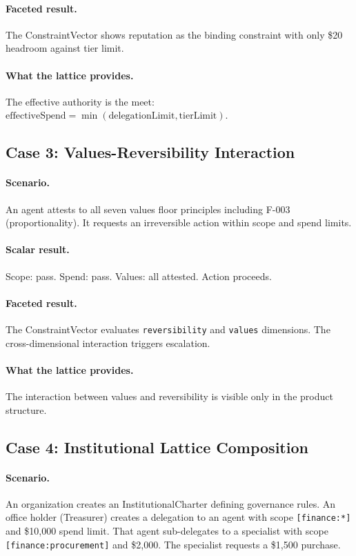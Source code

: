 \documentclass[sigconf,nonacm]{acmart}
\begin{document}
\paragraph{Faceted result.} The ConstraintVector shows reputation as the binding constraint
with only \$20 headroom against tier limit.

\paragraph{What the lattice provides.} The effective authority is the meet:
$\text{effectiveSpend} = \min(\text{delegationLimit}, \text{tierLimit})$.

\subsection{Case 3: Values-Reversibility Interaction}

\paragraph{Scenario.} An agent attests to all seven values floor principles including
F-003 (proportionality). It requests an irreversible action within scope and spend limits.

\paragraph{Scalar result.} Scope: pass. Spend: pass. Values: all attested. Action proceeds.

\paragraph{Faceted result.} The ConstraintVector evaluates \texttt{reversibility}
and \texttt{values} dimensions. The cross-dimensional interaction triggers escalation.

\paragraph{What the lattice provides.} The interaction between values and reversibility
is visible only in the product structure.

\subsection{Case 4: Institutional Lattice Composition}

\paragraph{Scenario.} An organization creates an InstitutionalCharter defining governance
rules. An office holder (Treasurer) creates a delegation to an agent with scope
\texttt{[finance:*]} and \$10{,}000 spend limit. That agent sub-delegates to a specialist
with scope \texttt{[finance:procurement]} and \$2{,}000. The specialist requests a
\$1{,}500 purchase.
\end{document}
